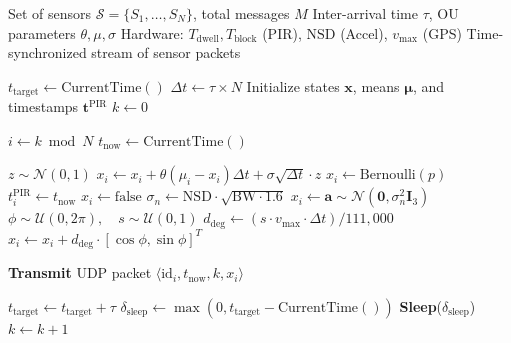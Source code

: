 \documentclass[jsan,article,submit,moreauthors,pdftex]{Definitions/mdpi}
\begin{document}
\begin{algorithm}[H]
\caption{Physically-Validated Sensor Data Generation with Drift Compensation}
\label{alg:sensor_sim}
\begin{algorithmic}[1]
\Require Set of sensors $\mathcal{S} = \{S_1, \ldots, S_N\}$, total messages $M$
\Require Inter-arrival time $\tau$, OU parameters $\theta, \mu, \sigma$
\Require Hardware: $T_{\text{dwell}}, T_{\text{block}}$ (PIR), $\text{NSD}$ (Accel), $v_{\max}$ (GPS)
\Ensure Time-synchronized stream of sensor packets

\State $t_{\text{target}} \leftarrow \text{CurrentTime}()$ 
\State $\Delta t \leftarrow \tau \times N$ 
\State Initialize states $\mathbf{x}$, means $\bm{\mu}$, and timestamps $\mathbf{t}^{\text{PIR}}$
\State $k \leftarrow 0$

    \State $i \leftarrow k \bmod N$ 
    \State $t_{\text{now}} \leftarrow \text{CurrentTime}()$

    \State {}
     
        \State $z \sim \mathcal{N}(0, 1)$
        \State $x_i \leftarrow x_i + \theta(\mu_i - x_i)\Delta t + \sigma \sqrt{\Delta t} \cdot z$
     
            \State $x_i \leftarrow \text{Bernoulli}(p)$
             $t_{i}^{\text{PIR}} \leftarrow t_{\text{now}}$ \EndIf
        \Else
            \State $x_i \leftarrow \text{false}$
        \EndIf
     
        \State $\sigma_n \leftarrow \text{NSD} \cdot \sqrt{\text{BW} \cdot 1.6}$
        \State $x_i \leftarrow \mathbf{a} \sim \mathcal{N}(\mathbf{0}, \sigma_n^2 \mathbf{I}_3)$
     
        \State $\phi \sim \mathcal{U}(0, 2\pi), \quad s \sim \mathcal{U}(0, 1)$
        \State $d_{\text{deg}} \leftarrow (s \cdot v_{\max} \cdot \Delta t) / 111{,}000$ 
        \State $x_i \leftarrow x_i + d_{\text{deg}} \cdot [\cos\phi, \sin\phi]^T$
    \EndIf

    \State \textbf{Transmit} UDP packet $\langle \text{id}_i, t_{\text{now}}, k, x_i \rangle$
    
    \State {}
    \State $t_{\text{target}} \leftarrow t_{\text{target}} + \tau$
    \State $\delta_{\text{sleep}} \leftarrow \max(0, t_{\text{target}} - \text{CurrentTime}())$
    \State \textbf{Sleep}($\delta_{\text{sleep}}$)
    \State $k \leftarrow k + 1$
\EndWhile
\end{algorithmic}
\end{algorithm}
\end{document}
